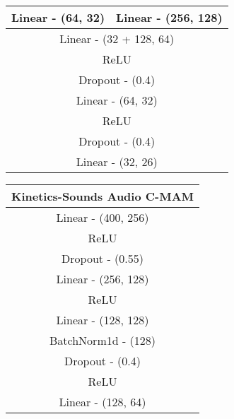 \begin{table}[h!]
\begin{minipage}[t]{0.44\textwidth}
\begin{tabular}{clllllclllll}
        \multicolumn{6}{c|}{Linear - (64, 32)}               & \multicolumn{6}{c}{Linear - (256, 128)}   \\ \hline
        \multicolumn{12}{c}{Linear - (32 + 128, 64)}                                                     \\ \hline
        \multicolumn{12}{c}{ReLU}                                                                        \\ \hline
        \multicolumn{12}{c}{Dropout - (0.4)}                                                             \\ \hline
        \multicolumn{12}{c}{Linear - (64, 32)}                                                           \\ \hline
        \multicolumn{12}{c}{ReLU}                                                                        \\ \hline
        \multicolumn{12}{c}{Dropout - (0.4)}                                                             \\ \hline
        \multicolumn{12}{c}{Linear - (32, 26)}                                                           \\ \hline
    \end{tabular}
    \end{minipage}%
    \hfill
    \begin{minipage}[t]{0.30\textwidth}
    \centering
    \vspace{0pt} %
    \begin{tabular}{|clllll|}
        \hline
        \multicolumn{6}{c}{\textbf{Kinetics-Sounds Audio C-MAM}} \\ \hline
        \multicolumn{6}{c}{Linear - (400, 256)} \\ \hline
        \multicolumn{6}{c}{ReLU}                \\ \hline
        \multicolumn{6}{c}{Dropout - (0.55)}    \\ \hline
        \multicolumn{6}{c}{Linear - (256, 128)} \\ \hline
        \multicolumn{6}{c}{ReLU} \\ \hline
        \multicolumn{6}{c}{Linear - (128, 128)} \\ \hline
        \multicolumn{6}{c}{BatchNorm1d - (128)} \\ \hline
        \multicolumn{6}{c}{Dropout - (0.4)} \\ \hline
        \multicolumn{6}{c}{ReLU} \\ \hline
        \multicolumn{6}{c}{Linear - (128, 64)} \\ \hline

\end{tabular}
\end{minipage}
\end{table}
